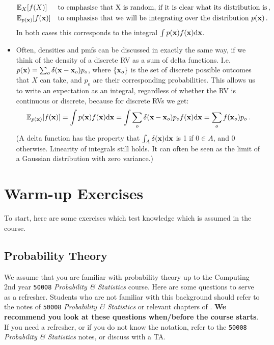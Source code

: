 \documentclass[a4paper]{article}
\theoremstyle{definition}
\newcommand{\courseprobstats}{\texttt{50008} \textit{Probability \& Statistics}}
\begin{document}
\begin{itemize}
\begin{align}
    &\Exp{X}{f(X)} && \text{to emphasise that X is random, if it is clear what its distribution is}\,, \\
    &\Exp{p(\vx)}{f(\vx)} && \text{to emphasise that we will be integrating over the distribution $p(\vx)$} \,.
\end{align}
In both cases this corresponds to the integral $\int p(\mathbf{x}) f(\mathbf{x}) \mathrm{d}\mathbf{x}$.
\item Often, densities and pmfs can be discussed in exactly the same way, if we think of the density of a discrete RV as a sum of delta functions. I.e.~$p(\mathbf{x}) = \sum_{o} \delta(\mathbf{x} - \mathbf{x}_o) p_o$, where $\{\mathbf{x}_o\}$ is the set of discrete possible outcomes that $X$ can take, and $p_o$ are their corresponding probabilities. This allows us to write an expectation as an integral, regardless of whether the RV is continuous or discrete, because for discrete RVs we get:
\begin{align}
\Exp{p(\vx)}{f(\vx)} = \int p(\vx) f(\vx) \calcd\vx = \int \sum_o \delta(\vx - \vx_o) p_o f(\vx) \calcd\vx = \sum_o f(\vx_o)p_o \,.
\end{align}
(A delta function has the property that $\int_A \delta(\mathbf{x}) \mathrm{d}\mathbf{x}$ is 1 if $0 \in A$, and 0 otherwise. Linearity of integrals still holds. It can often be seen as the limit of a Gaussian distribution with zero variance.)
\end{itemize}




\section{Warm-up Exercises}
To start, here are some exercises which test knowledge which is assumed in the course.

\subsection{Probability Theory}
We assume that you are familiar with probability theory up to the Computing 2nd year \courseprobstats{} course. Here are some questions to serve as a refresher. Students who are not familiar with this background should refer to the notes of \courseprobstats{} or relevant chapters of \citep{mml}. \textbf{We recommend you look at these questions when/before the course starts}. If you need a refresher, or if you do not know the notation, refer to the \courseprobstats{} notes, or discuss with a TA.
\end{document}
